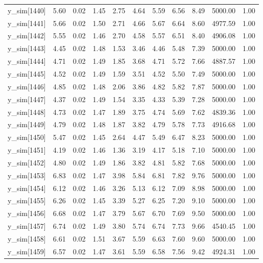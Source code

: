 \begin{table}[ht]
\begin{tabular}{rrrrrrrrrrr}
  y\_sim[1440] & 5.60 & 0.02 & 1.45 & 2.75 & 4.64 & 5.59 & 6.56 & 8.49 & 5000.00 & 1.00 \\ 
  y\_sim[1441] & 5.66 & 0.02 & 1.50 & 2.71 & 4.66 & 5.67 & 6.64 & 8.60 & 4977.59 & 1.00 \\ 
  y\_sim[1442] & 5.55 & 0.02 & 1.46 & 2.70 & 4.58 & 5.57 & 6.51 & 8.40 & 4906.08 & 1.00 \\ 
  y\_sim[1443] & 4.45 & 0.02 & 1.48 & 1.53 & 3.46 & 4.46 & 5.48 & 7.39 & 5000.00 & 1.00 \\ 
  y\_sim[1444] & 4.71 & 0.02 & 1.49 & 1.85 & 3.68 & 4.71 & 5.72 & 7.66 & 4887.57 & 1.00 \\ 
  y\_sim[1445] & 4.52 & 0.02 & 1.49 & 1.59 & 3.51 & 4.52 & 5.50 & 7.49 & 5000.00 & 1.00 \\ 
  y\_sim[1446] & 4.85 & 0.02 & 1.48 & 2.06 & 3.86 & 4.82 & 5.82 & 7.87 & 5000.00 & 1.00 \\ 
  y\_sim[1447] & 4.37 & 0.02 & 1.49 & 1.54 & 3.35 & 4.33 & 5.39 & 7.28 & 5000.00 & 1.00 \\ 
  y\_sim[1448] & 4.73 & 0.02 & 1.47 & 1.89 & 3.75 & 4.74 & 5.69 & 7.62 & 4839.36 & 1.00 \\ 
  y\_sim[1449] & 4.79 & 0.02 & 1.48 & 1.87 & 3.82 & 4.79 & 5.78 & 7.73 & 4916.68 & 1.00 \\ 
  y\_sim[1450] & 5.47 & 0.02 & 1.45 & 2.64 & 4.47 & 5.49 & 6.47 & 8.23 & 5000.00 & 1.00 \\ 
  y\_sim[1451] & 4.19 & 0.02 & 1.46 & 1.36 & 3.19 & 4.17 & 5.18 & 7.10 & 5000.00 & 1.00 \\ 
  y\_sim[1452] & 4.80 & 0.02 & 1.49 & 1.86 & 3.82 & 4.81 & 5.82 & 7.68 & 5000.00 & 1.00 \\ 
  y\_sim[1453] & 6.83 & 0.02 & 1.47 & 3.98 & 5.84 & 6.81 & 7.82 & 9.76 & 5000.00 & 1.00 \\ 
  y\_sim[1454] & 6.12 & 0.02 & 1.46 & 3.26 & 5.13 & 6.12 & 7.09 & 8.98 & 5000.00 & 1.00 \\ 
  y\_sim[1455] & 6.26 & 0.02 & 1.45 & 3.39 & 5.27 & 6.25 & 7.20 & 9.10 & 5000.00 & 1.00 \\ 
  y\_sim[1456] & 6.68 & 0.02 & 1.47 & 3.79 & 5.67 & 6.70 & 7.69 & 9.50 & 5000.00 & 1.00 \\ 
  y\_sim[1457] & 6.74 & 0.02 & 1.49 & 3.80 & 5.74 & 6.74 & 7.73 & 9.66 & 4540.45 & 1.00 \\ 
  y\_sim[1458] & 6.61 & 0.02 & 1.51 & 3.67 & 5.59 & 6.63 & 7.60 & 9.60 & 5000.00 & 1.00 \\ 
  y\_sim[1459] & 6.57 & 0.02 & 1.47 & 3.61 & 5.59 & 6.58 & 7.56 & 9.42 & 4924.31 & 1.00 \\ 

\end{tabular}
\end{table}
